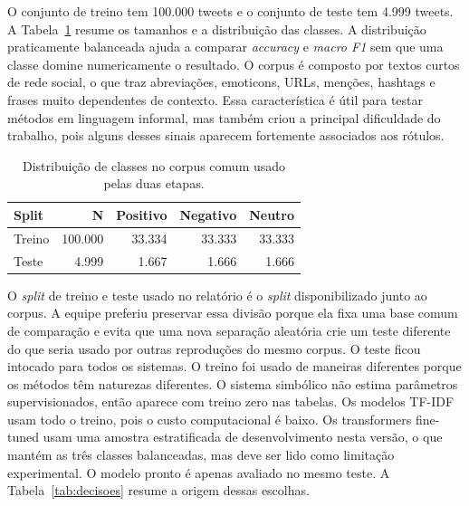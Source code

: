 \documentclass[11pt,a4paper]{article}
\begin{document}
O conjunto de treino tem 100.000 tweets e o conjunto de teste tem 4.999 tweets. A Tabela~\ref{tab:dataset} resume os tamanhos e a distribuição das classes. A distribuição praticamente balanceada ajuda a comparar \emph{accuracy} e \emph{macro F1} sem que uma classe domine numericamente o resultado. O corpus é composto por textos curtos de rede social, o que traz abreviações, emoticons, URLs, menções, hashtags e frases muito dependentes de contexto. Essa característica é útil para testar métodos em linguagem informal, mas também criou a principal dificuldade do trabalho, pois alguns desses sinais aparecem fortemente associados aos rótulos.

\begin{table}[h]
\small
\centering
\begin{tabular}{@{}lrrrr@{}}
\toprule
\textbf{Split} & \textbf{N} & \textbf{Positivo} & \textbf{Negativo} & \textbf{Neutro} \\
\midrule
Treino & 100.000 & 33.334 & 33.333 & 33.333 \\
Teste & 4.999 & 1.667 & 1.666 & 1.666 \\
\bottomrule
\end{tabular}
\caption{Distribuição de classes no corpus comum usado pelas duas etapas.}
\label{tab:dataset}
\end{table}

O \emph{split} de treino e teste usado no relatório é o \emph{split} disponibilizado junto ao corpus. A equipe preferiu preservar essa divisão porque ela fixa uma base comum de comparação e evita que uma nova separação aleatória crie um teste diferente do que seria usado por outras reproduções do mesmo corpus. O teste ficou intocado para todos os sistemas. O treino foi usado de maneiras diferentes porque os métodos têm naturezas diferentes. O sistema simbólico não estima parâmetros supervisionados, então aparece com treino zero nas tabelas. Os modelos TF-IDF usam todo o treino, pois o custo computacional é baixo. Os transformers fine-tuned usam uma amostra estratificada de desenvolvimento nesta versão, o que mantém as três classes balanceadas, mas deve ser lido como limitação experimental. O modelo pronto é apenas avaliado no mesmo teste. A Tabela~\ref{tab:decisoes} resume a origem dessas escolhas.
\end{document}
